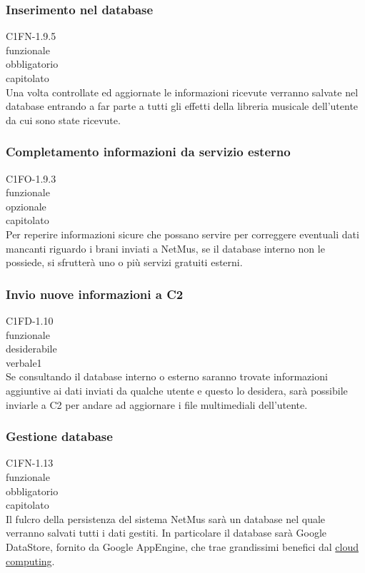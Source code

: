 \subsubsection*{Inserimento nel database}
 C1FN-1.9.5 \\
 funzionale \\
 obbligatorio \\
 capitolato \\
Una volta controllate ed aggiornate le informazioni ricevute verranno salvate
nel database entrando a far parte a tutti gli effetti della libreria musicale
dell'utente da cui sono state ricevute.

\subsubsection*{Completamento informazioni da servizio esterno}
 C1FO-1.9.3 \\
 funzionale \\
 opzionale \\
 capitolato \\
Per reperire informazioni sicure che possano servire per correggere eventuali
dati mancanti riguardo i brani inviati a NetMus, se il database interno non le
possiede, si sfrutter\`a uno o pi\`u servizi gratuiti esterni.

\subsubsection*{Invio nuove informazioni a C2}
 C1FD-1.10 \\
 funzionale \\
 desiderabile \\
 verbale1 \\
Se consultando il database interno o esterno saranno trovate informazioni
aggiuntive ai dati inviati da qualche utente e questo lo desidera, sar\`a
possibile inviarle a C2 per andare ad aggiornare i file multimediali
dell'utente.

\subsubsection*{Gestione database}
 C1FN-1.13 \\
 funzionale \\
 obbligatorio \\
 capitolato \\
Il fulcro della persistenza del sistema NetMus sar\`a un database nel quale
verranno salvati tutti i dati gestiti. In particolare il database sar\`a Google
DataStore, fornito da Google AppEngine, che trae grandissimi benefici
dal \underline{cloud computing}.

